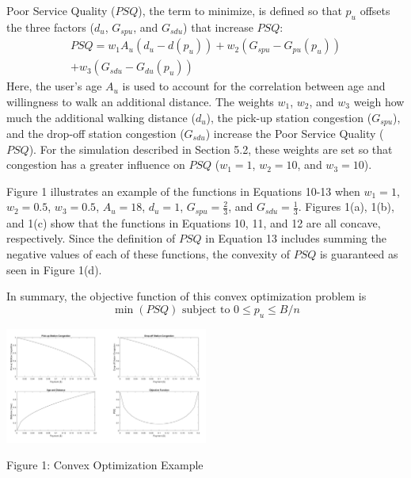 \documentclass[times, 10pt,twocolumn]{article}
\begin{document}
Poor Service Quality ($PSQ$), the term to minimize, is defined so that $p_u$ offsets the three factors ($d_u$, $G_{spu}$, and $G_{sdu}$) that increase $PSQ$:
\begin{equation}
\begin{split}
PSQ = w_1A_u(d_u - d(p_u)) + w_2(G_{spu} - G_{pu}(p_u)) \\ + w_3(G_{sdu} - G_{du}(p_u))
\end{split}
\end{equation}
Here, the user's age $A_u$ is used to account for the correlation between age and willingness to walk an additional distance. The weights $w_1$, $w_2$, and $w_3$ weigh how much the additional walking distance ($d_u$), the pick-up station congestion ($G_{spu}$), and the drop-off station congestion ($G_{sdu}$) increase the Poor Service Quality ($PSQ$). For the simulation described in Section 5.2, these weights are set so that congestion has a greater influence on $PSQ$ ($w_1 = 1$, $w_2 = 10$, and $w_3 = 10$).

Figure 1 illustrates an example of the functions in Equations 10-13 when $w_1 = 1$, $w_2 = 0.5$, $w_3 = 0.5$, $A_u = 18$, $d_u = 1$, $G_{spu} = \frac{2}{3}$, and $G_{sdu} = \frac{1}{3}$. Figures 1(a), 1(b), and 1(c) show that the functions in Equations 10, 11, and 12 are all concave, respectively. Since the definition of $PSQ$ in Equation 13 includes summing the negative values of each of these functions, the convexity of $PSQ$ is guaranteed as seen in Figure 1(d).

\indent In summary, the objective function of this convex optimization problem is
\begin{equation}
\min(PSQ) \text{ subject to } 0 \leq p_u \leq B/n
\end{equation}


\centerline{\includegraphics[width=0.5\textwidth]{m4/poster_plot.png}}
\centerline{Figure 1: Convex Optimization Example}
\hfill \break
\end{document}
